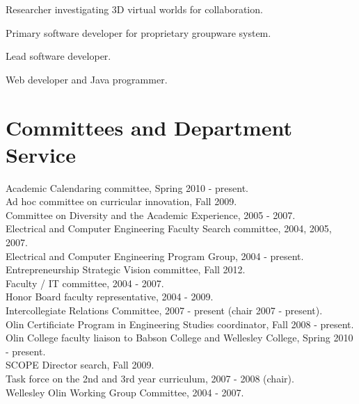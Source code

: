 \documentclass[line]{res}
\begin{document}
\begin{resume}
	\begin{position}
		Researcher investigating 3D virtual worlds for collaboration. 
	\end{position}
	
	\begin{position}
		Primary software developer for proprietary groupware system. 
	\end{position}
	
	\begin{position}
		Lead software developer. 
	\end{position}
	
	\begin{position}
		Web developer and Java programmer. 
	\end{position}
	
	\section{\sc Committees and Department Service}
	
	Academic Calendaring committee, Spring 2010 - present.\\
	Ad hoc committee on curricular innovation, Fall 2009.\\
	Committee on Diversity and the Academic Experience, 2005 - 2007.\\
	Electrical and Computer Engineering Faculty Search committee, 2004, 2005, 2007.\\
	Electrical and Computer Engineering Program Group, 2004 - present.\\
	Entrepreneurship Strategic Vision committee, Fall 2012.\\
	Faculty / IT committee, 2004 - 2007.\\
	Honor Board faculty representative, 2004 - 2009.\\
	Intercollegiate Relations Committee, 2007 - present (chair 2007 - present).\\
	Olin Certificiate Program in Engineering Studies coordinator, Fall 2008 - present.\\
	Olin College faculty liaison to Babson College and Wellesley College, Spring 2010 - present.\\
	SCOPE Director search, Fall 2009.\\
	Task force on the 2nd and 3rd year curriculum, 2007 - 2008 (chair).\\
	Wellesley Olin Working Group Committee, 2004 - 2007.\\
	

\end{resume}
\end{document}
